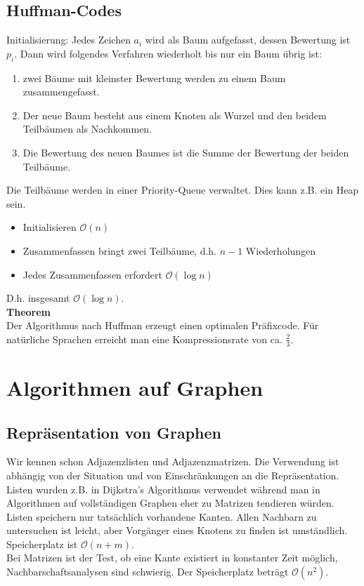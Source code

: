 \documentclass[a4paper, 12pt]{article}
\begin{document}
	\subsection{Huffman-Codes}
	Initialisierung: Jedes Zeichen $a_i$ wird als Baum aufgefasst, dessen Bewertung ist $p_i$. Dann wird folgendes Verfahren wiederholt bis nur ein Baum übrig ist:\begin{enumerate}
		\item zwei Bäume mit kleinster Bewertung werden zu einem Baum zusammengefasst.
		\item Der neue Baum besteht aus einem Knoten als Wurzel und den beidem Teilbäumen als Nachkommen. 
		\item Die Bewertung des neuen Baumes ist die Summe der Bewertung der beiden Teilbäume.
	\end{enumerate} 
	Die Teilbäume werden in einer Priority-Queue verwaltet. Dies kann z.B. ein Heap sein. \begin{itemize}
		\item Initialisieren $\mathcal{O}(n)$
		\item Zusammenfassen bringt zwei Teilbäume, d.h. $n-1$ Wiederholungen
		\item Jedes Zusammenfassen erfordert $\mathcal{O}(\log n)$
	\end{itemize}
	D.h. insgesamt $\mathcal{O}(\log n)$.\\
	\textbf{Theorem}\\
	Der Algorithmus nach Huffman erzeugt einen optimalen Präfixcode. Für natürliche Sprachen erreicht man eine Kompressionsrate von ca. $\frac{2}{3}$.
	\section{Algorithmen auf Graphen}
	\subsection{Repräsentation von Graphen}
	Wir kennen schon Adjazenzlisten und Adjazenzmatrizen. Die Verwendung ist abhängig von der Situation und von Einschränkungen an die Repräsentation. Listen wurden z.B. in Dijkstra's Algorithmus verwendet während man in Algorithmen auf vollständigen Graphen eher zu Matrizen tendieren würden.\\
	
	Listen speichern nur tatsächlich vorhandene Kanten. Allen Nachbarn zu untersuchen ist leicht, aber Vorgänger eines Knotens zu finden ist umständlich. Speicherplatz ist $\mathcal{O}(n+m)$.\\
	Bei Matrizen ist der Test, ob eine Kante existiert in konstanter Zeit möglich, Nachbarschaftsanalysen sind schwierig. Der Speicherplatz beträgt $\mathcal{O}(n^2)$.
\end{document}
